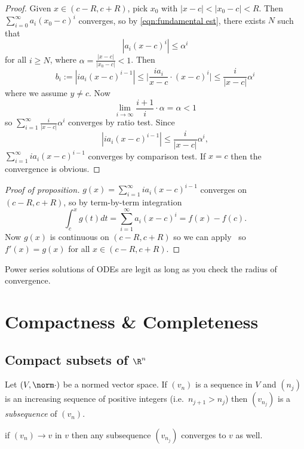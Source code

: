 \documentclass[a4paper]{article}
\theoremstyle{definition}
\begin{document}
\begin{proof}
  Given \(x\in(c-R,c+R)\), pick \(x_0\) with \(|x-c| < |x_0-c| < R\). Then \(\sum_{i=0}^{\infty}a_i(x_0-c)^i \) converges, so by \ref{eqn:fundamental est}, there exists \(N\) such that
  \[
    |a_i(x-c)^i| \leq \alpha^i
  \]
  for all \(i\geq N\), where \(\alpha = \frac{|x-c|}{|x_0-c|}<1\). Then
  \[
    b_i:= |i a_i (x-c)^{i-1}| \leq \Big| \frac{i a_i}{x-c}\cdot(x-c)^i \Big| \leq \frac{i}{|x-c|}\alpha^i
  \]
  where we assume \(y\neq c\). Now
  \[
    \lim_{i\to\infty} \frac{i+1}{i}\cdot\alpha = \alpha<1
  \]
  so \(\sum_{i=1}^{\infty}\frac{i}{|x-c|}\alpha^i \) converges by ratio test. Since
  \[
    |i a_i(x-c)^{i-1}| \leq \frac{i}{|x-c|}\alpha^i,
  \]
  \(\sum_{i=1}^{\infty}i a_i(x-c)^{i-1} \) converges by comparison test. If \(x=c\) then the convergence is obvious.
\end{proof}

\begin{proof}[Proof of proposition]
  \(g(x) = \sum_{i=1}^{\infty}i a_i (x-c)^{i-1} \) converges on \((c-R,c+R)\), so by term-by-term integration
  \[
    \int_{c}^{x} g(t) dt = \sum_{i=1}^{\infty}a_i(x-c)^i = f(x) - f(c).
  \]
  Now \(g(x)\) is continuous on \((c-R, c+R)\) so we can apply~ so \(f'(x) = g(x)\) for all \(x\in(c-R,c+R)\).
\end{proof}

\begin{application}
  Power series solutions of ODEs are legit as long as you check the radius of convergence.
\end{application}

\section{Compactness \& Completeness}

\subsection{Compact subsets of \texorpdfstring{\(\R^n\)}{ℝ\^{}n}}

Let \((V, \norm \cdot)\) be a normed vector space. If \((v_n)\) is a sequence in \(V\) and \((n_j)\) is an increasing sequence of positive integers (i.e.\ \(n_{j+1}>n_j\)) then \((v_{n_j})\) is a \emph{subsequence} of \((v_n)\).

\begin{ex}
  if \((v_n)\to v\) in \(v\) then any subsequence \((v_{n_j})\) converges to \(v\) as well.
\end{ex}
\end{document}
